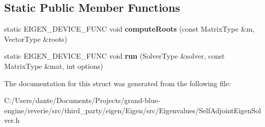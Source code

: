\subsection*{Static Public Member Functions}
\begin{DoxyCompactItemize}
\item 
\mbox{\label{struct_eigen_1_1internal_1_1direct__selfadjoint__eigenvalues_3_01_solver_type_00_012_00_01false_01_4_a49dab7c21eb393c3c3d45890bd34f58e}} 
static E\+I\+G\+E\+N\+\_\+\+D\+E\+V\+I\+C\+E\+\_\+\+F\+U\+NC void {\bfseries compute\+Roots} (const Matrix\+Type \&m, Vector\+Type \&roots)
\item 
\mbox{\label{struct_eigen_1_1internal_1_1direct__selfadjoint__eigenvalues_3_01_solver_type_00_012_00_01false_01_4_addc88bfeaab72fc09c5429df3d680bd7}} 
static E\+I\+G\+E\+N\+\_\+\+D\+E\+V\+I\+C\+E\+\_\+\+F\+U\+NC void {\bfseries run} (Solver\+Type \&solver, const Matrix\+Type \&mat, int options)
\end{DoxyCompactItemize}


The documentation for this struct was generated from the following file\+:\begin{DoxyCompactItemize}
\item 
C\+:/\+Users/dante/\+Documents/\+Projects/grand-\/blue-\/engine/reverie/src/third\+\_\+party/eigen/\+Eigen/src/\+Eigenvalues/Self\+Adjoint\+Eigen\+Solver.\+h\end{DoxyCompactItemize}
